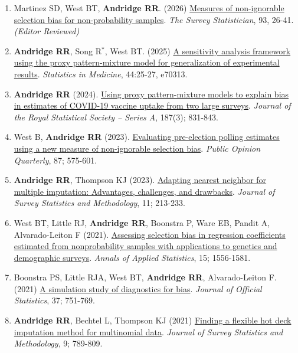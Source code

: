 \documentclass[
  english,
  letterpaper,
  DIV=11,
  numbers=noendperiod]{scrartcl}
\providecommand{\tightlist}{%
  \setlength{\itemsep}{0pt}\setlength{\parskip}{0pt}}
\begin{document}
\begin{enumerate}
\def\labelenumi{\arabic{enumi}.}
\tightlist
\item
  Martinez SD, West BT, \textbf{Andridge RR}. (2026)
  \href{https://isi-iass.org/home/wp-content/uploads/Survey_Statistician_2026_January_N93_05.pdf}{Measures
  of non-ignorable selection bias for non-probability samples}.
  \emph{The Survey Statistician}, 93, 26-41. \emph{(Editor Reviewed)}
\item
  \textbf{Andridge RR}, Song R\(^*\), West BT. (2025)
  \href{https://doi.org/10.1002/sim.70313}{A sensitivity analysis
  framework using the proxy pattern-mixture model for generalization of
  experimental results}. \emph{Statistics in Medicine}, 44:25-27,
  e70313.
\item
  \textbf{Andridge RR} (2024).
  \href{https://doi.org/10.1093/jrsssa/qnae005}{Using proxy
  pattern-mixture models to explain bias in estimates of COVID-19
  vaccine uptake from two large surveys}. \emph{Journal of the Royal
  Statistical Society -- Series A}, 187(3); 831-843.
\item
  West B, \textbf{Andridge RR} (2023).
  \href{https://doi.org/10.1093/poq/nfad018}{Evaluating pre-election
  polling estimates using a new measure of non-ignorable selection
  bias}. \emph{Public Opinion Quarterly}, 87; 575-601.
\item
  \textbf{Andridge RR}, Thompson KJ (2023).
  \href{https://doi.org/10.1093/jssam/smab058}{Adapting nearest neighbor
  for multiple imputation: Advantages, challenges, and drawbacks}.
  \emph{Journal of Survey Statistics and Methodology}, 11; 213-233.
\item
  West BT, Little RJ, \textbf{Andridge RR}, Boonstra P, Ware EB, Pandit
  A, Alvarado-Leiton F (2021).
  \href{https://doi.org/10.1214/21-AOAS1453}{Assessing selection bias in
  regression coefficients estimated from nonprobability samples with
  applications to genetics and demographic surveys}. \emph{Annals of
  Applied Statistics}, 15; 1556-1581.
\item
  Boonstra PS, Little RJA, West BT, \textbf{Andridge RR},
  Alvarado-Leiton F. (2021)
  \href{https://doi.org/10.2478/jos-2021-0033}{A simulation study of
  diagnostics for bias}. \emph{Journal of Official Statistics}, 37;
  751-769.
\item
  \textbf{Andridge RR}, Bechtel L, Thompson KJ (2021)
  \href{https://doi.org/10.1093/jssam/smaa005}{Finding a flexible hot
  deck imputation method for multinomial data}. \emph{Journal of Survey
  Statistics and Methodology}, 9; 789-809.

\end{enumerate}
\end{document}

